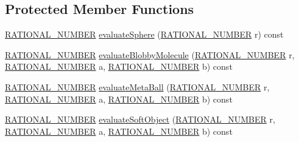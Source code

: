 \subsection*{Protected Member Functions}
\begin{DoxyCompactItemize}
\item 
\hyperlink{namespace_utilities_a40969b96bd8d847b962e297cb79f08ce}{RATIONAL\_\-NUMBER} \hyperlink{class_graphics_1_1_implicit_surface_ab23500f48bacf5a1bd06f79be65f658f}{evaluateSphere} (\hyperlink{namespace_utilities_a40969b96bd8d847b962e297cb79f08ce}{RATIONAL\_\-NUMBER} r) const 
\item 
\hyperlink{namespace_utilities_a40969b96bd8d847b962e297cb79f08ce}{RATIONAL\_\-NUMBER} \hyperlink{class_graphics_1_1_implicit_surface_a2c2826f621e9dd215aea556e02fae896}{evaluateBlobbyMolecule} (\hyperlink{namespace_utilities_a40969b96bd8d847b962e297cb79f08ce}{RATIONAL\_\-NUMBER} r, \hyperlink{namespace_utilities_a40969b96bd8d847b962e297cb79f08ce}{RATIONAL\_\-NUMBER} a, \hyperlink{namespace_utilities_a40969b96bd8d847b962e297cb79f08ce}{RATIONAL\_\-NUMBER} b) const 
\item 
\hyperlink{namespace_utilities_a40969b96bd8d847b962e297cb79f08ce}{RATIONAL\_\-NUMBER} \hyperlink{class_graphics_1_1_implicit_surface_ab98337201088aa08c1f0e5f15dfada5d}{evaluateMetaBall} (\hyperlink{namespace_utilities_a40969b96bd8d847b962e297cb79f08ce}{RATIONAL\_\-NUMBER} r, \hyperlink{namespace_utilities_a40969b96bd8d847b962e297cb79f08ce}{RATIONAL\_\-NUMBER} a, \hyperlink{namespace_utilities_a40969b96bd8d847b962e297cb79f08ce}{RATIONAL\_\-NUMBER} b) const 
\item 
\hyperlink{namespace_utilities_a40969b96bd8d847b962e297cb79f08ce}{RATIONAL\_\-NUMBER} \hyperlink{class_graphics_1_1_implicit_surface_abdcbdf1cfcf7b881f6878b7c23240aeb}{evaluateSoftObject} (\hyperlink{namespace_utilities_a40969b96bd8d847b962e297cb79f08ce}{RATIONAL\_\-NUMBER} r, \hyperlink{namespace_utilities_a40969b96bd8d847b962e297cb79f08ce}{RATIONAL\_\-NUMBER} a, \hyperlink{namespace_utilities_a40969b96bd8d847b962e297cb79f08ce}{RATIONAL\_\-NUMBER} b) const 
\end{DoxyCompactItemize}
